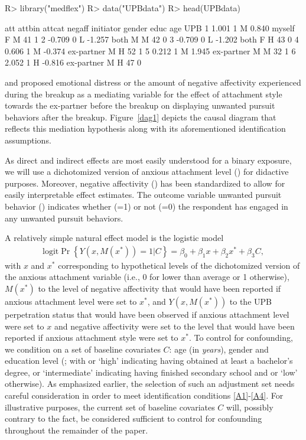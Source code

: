 \documentclass[nojss]{jss}
\begin{document}
\begin{Schunk}
\begin{Sinput}
R> library("medflex")
R> data("UPBdata")
R> head(UPBdata)
\end{Sinput}
\begin{Soutput}
     att attbin attcat negaff  initiator gender educ age UPB
1  1.001      1      M  0.840     myself      F    M  41   1
2 -0.709      0      L -1.257       both      M    M  42   0
3 -0.709      0      L -1.202       both      F    H  43   0
4  0.606      1      M -0.374 ex-partner      M    H  52   1
5  0.212      1      M  1.945 ex-partner      M    M  32   1
6  2.052      1      H -0.816 ex-partner      M    H  47   0
\end{Soutput}
\end{Schunk}
\cite{Smet2012} and \cite{Loeys2013a} proposed emotional distress or the amount of negative affectivity experienced during the breakup as a mediating variable for the effect of attachment style towards the ex-partner before the breakup on displaying unwanted pursuit behaviors after the breakup. Figure~\ref{dag1} depicts the causal diagram \citep{Pearl1995} that reflects this mediation hypothesis along with its aforementioned identification assumptions. 
\par As direct and indirect effects are most easily understood for a binary exposure, we will use a dichotomized version of anxious attachment level () for didactive purposes. Moreover, negative affectivity () has been standardized to allow for easily interpretable effect estimates. The outcome variable unwanted pursuit behavior () indicates whether (=1) or not (=0) the respondent has engaged in any unwanted pursuit behaviors. 
\par A relatively simple natural effect model is the logistic model
\begin{align}
\mbox{logit} \Pr\left\{Y(x,M(x^*))=1|C\right\} = \beta_0 + \beta_1 x + \beta_2 x^* + \beta_3 C,
\label{eq:nemodelnoia}
\end{align}
with $x$ and $x^*$ corresponding to hypothetical levels of the dichotomized version of the anxious attachment variable (i.e., 0 for lower than average or 1 otherwise), $M(x^*)$ to the level of negative affectivity that would have been reported if anxious attachment level were set to $x^*$, and $Y(x,M(x^*))$ to the UPB perpetration status that would have been observed if anxious attachment level were set to $x$ and negative affectivity were set to the level that would have been reported if anxious attachment style were set to $x^*$. To control for confounding, we condition on a set of baseline covariates $C$: age (in \textit{years}), gender and education level (; with  or `high' indicating having obtained at least a bachelor's degree,  or `intermediate' indicating having finished secondary school and  or `low' otherwise). As emphasized earlier, the selection of such an adjustment set needs careful consideration in order to meet identification conditions \ref{A1}-\ref{A4}. For illustrative purposes, the current set of baseline covariates $C$ will, possibly contrary to the fact, be considered sufficient to control for confounding throughout the remainder of the paper.
\end{document}
